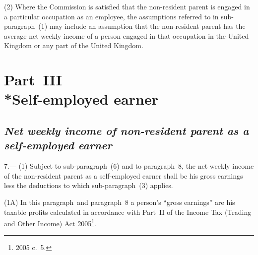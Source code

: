 \documentclass[12pt,a4paper]{article}
\begin{document}
(2) Where the Commission is satisfied that the non-resident parent is engaged in a particular occupation as an employee, the assumptions referred to in sub-paragraph~(1) may include an assumption that the non-resident parent has the average net weekly income of a person engaged in that occupation in the United Kingdom or any part of the United Kingdom.


\section[Part~III --- Self-employed earner]{Part~III\\*Self-employed earner}

\renewcommand\parthead{--- Schedule~Part~III}

\subsection*{\itshape 
Net weekly income of non-resident parent as a self-employed earner  %
}

7.---%
%
%
(1) Subject to sub-paragraph~(6) and to paragraph~8, the net weekly income of the non-resident parent as a self-employed earner shall be his gross earnings less the deductions to which sub-paragraph~(3) applies.

(1A) In this paragraph~and paragraph~8 a person’s “gross earnings” are his taxable profits calculated in accordance with Part~II of the Income Tax (Trading and Other Income) Act 2005\footnote{2005 c.\ 5.}.
\end{document}
